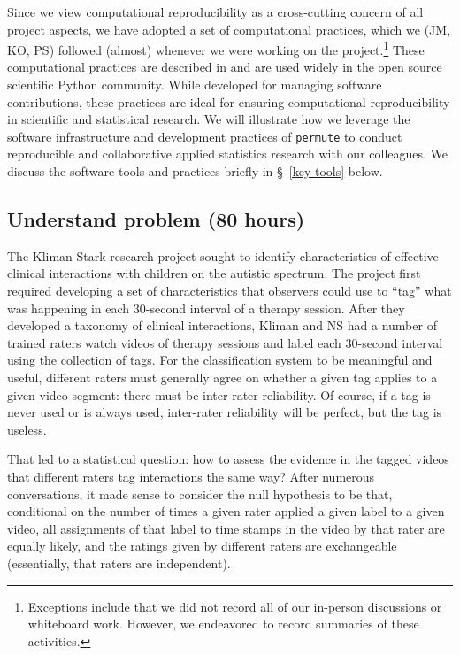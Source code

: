 \documentclass[]{article}
\begin{document}
Since we view computational reproducibility as a cross-cutting concern of all
project aspects, we have adopted a set of computational practices, which we
(JM, KO, PS) followed (almost) whenever we were working on the
project.\footnote{Exceptions include that we did not record all of our
in-person discussions or whiteboard work.  
However, we endeavored to
record summaries of these activities.}
These computational practices are described in \citet{millman2014developing}
and are used widely in the open source scientific Python community.
While developed for managing software contributions, these practices are ideal
for ensuring computational reproducibility in scientific and statistical
research.
We will illustrate how we leverage the software infrastructure and development
practices of \texttt{permute} to conduct reproducible and collaborative applied
statistics research with our colleagues.
We discuss the software tools and practices briefly in \S~\ref{key-tools} below.

\subsection{Understand problem (80 hours)}
The Kliman-Stark research project sought to identify characteristics of 
effective clinical interactions with children on the autistic spectrum.
The project first required developing a set of characteristics that observers
could use to ``tag'' what was happening in each 30-second interval of a 
therapy session.
After they developed a taxonomy of clinical interactions, Kliman and NS had a 
number of trained raters watch videos of therapy sessions and label each 
30-second interval using the collection of tags.
For the classification system to be meaningful and useful, different
raters must generally agree on whether a given tag applies to a given video segment:
there must be inter-rater reliability.
Of course, if a tag is never used or is always used, inter-rater reliability will be perfect,
but the tag is useless.

That led to a statistical question: how to assess the evidence in the tagged videos
that different raters
tag interactions the same way? 
After numerous conversations, it made sense to consider the null hypothesis to be
that, conditional on the number of times a given rater applied a given label to
a given video, all assignments of that label to time stamps in the video by that
rater are equally
likely, and the ratings given by different raters are exchangeable (essentially, that
raters are independent).
\end{document}
